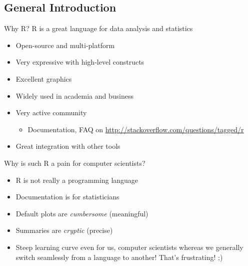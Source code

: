\documentclass[xcolor=x11names,compress,8pt]{beamer}
\renewcommand{\(}{\begin{columns}}
\renewcommand{\)}{\end{columns}}
\newcommand{\<}[1]{\begin{column}{#1}}
\renewcommand{\>}{\end{column}}
\begin{document}
\subsection{General Introduction}
\label{sec-4-1}
\begin{frame}[label=sec-4-1-1]{Why R?}
R is a great language for data analysis and statistics
\begin{itemize}
\item Open-source and multi-platform
\item Very expressive with high-level constructs
\item Excellent graphics
\item Widely used in academia and business
\item Very active community
\begin{itemize}
\item Documentation, FAQ on \url{http://stackoverflow.com/questions/tagged/r}
\end{itemize}
\item Great integration with other tools
\end{itemize}
\end{frame}
\begin{frame}[label=sec-4-1-2]{Why is such R a pain for computer scientists?}
\begin{itemize}
\item R is \alert{not} really a \alert{programming} language
\item Documentation is for statisticians
\item Default plots are \textit{cumbersome} (meaningful)
\item Summaries are \textit{cryptic} (precise)
\item \alert{Steep learning curve} even for us, computer scientists whereas we
generally switch seamlessly from a language to another!  That's
frustrating! ;)
\end{itemize}
\end{frame}
\end{document}
